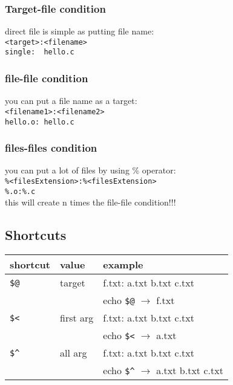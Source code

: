 \documentclass[12pt]{article}
\begin{document}
\subsubsection{Target-file condition}
direct file is simple as putting file name: \\
\verb|<target>:<filename>|\\
\verb|single:  hello.c|
\subsubsection{file-file condition}
you can put a file name as a target:\\
\verb|<filename1>:<filename2>|\\
\verb|hello.o: hello.c|
\subsubsection{files-files condition}
you can put a lot of files by using \% operator:\\
\verb|%<filesExtension>:%<filesExtension>|\\
\verb|%.o:%.c|\\
this will create n times the file-file condition!!!

\subsection{Shortcuts}
\begin{tabular}{|l|l|l|}
  \hline
  shortcut                & value     & example                                                      \\
  \hline
  \verb|$@| & target    & f.txt: a.txt b.txt c.txt                                     \\
                          &           & echo \verb|$@| $\rightarrow$ f.txt             \\ \hline
  \verb|$<| & first arg & f.txt: a.txt b.txt c.txt                                     \\
                          &           & echo \verb|$<| $\rightarrow$ a.txt             \\ \hline
  \verb|$^| & all arg   & f.txt: a.txt b.txt c.txt                                     \\
                          &           & echo \verb|$^| $\rightarrow$ a.txt b.txt c.txt \\ \hline
\end{tabular}
\end{document}
